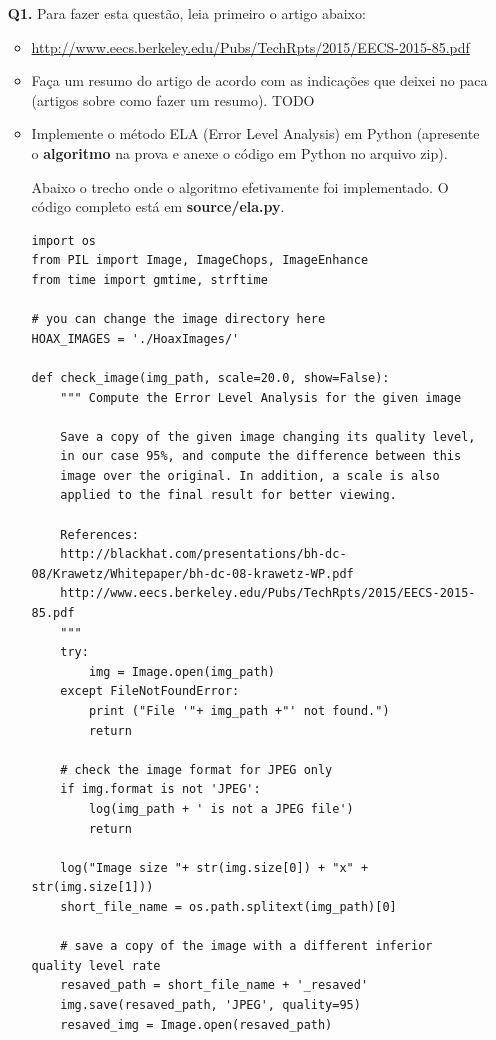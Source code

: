 \documentclass[12pt]{article}
\begin{document}
\begin{itemize}
\item[{\bf Q1.}] Para fazer esta questão, leia primeiro o artigo abaixo:
\begin{itemize}
\item \url{http://www.eecs.berkeley.edu/Pubs/TechRpts/2015/EECS-2015-85.pdf}
\end{itemize} 
\begin{itemize}
\item Faça um resumo do artigo de acordo com as indicações que deixei no paca (artigos sobre como fazer um resumo).
TODO

\item Implemente o método ELA (Error Level Analysis) em Python (apresente o 
\textbf{algoritmo} na prova e anexe o código em Python no arquivo zip).

Abaixo o trecho onde o algoritmo efetivamente foi implementado. O código completo está em \textbf{source/ela.py}.
    
\begin{lstlisting}[basicstyle=\ttfamily]
import os
from PIL import Image, ImageChops, ImageEnhance
from time import gmtime, strftime

# you can change the image directory here
HOAX_IMAGES = './HoaxImages/'

def check_image(img_path, scale=20.0, show=False):
    """ Compute the Error Level Analysis for the given image
    
    Save a copy of the given image changing its quality level,
    in our case 95%, and compute the difference between this 
    image over the original. In addition, a scale is also 
    applied to the final result for better viewing.
    
    References: 
    http://blackhat.com/presentations/bh-dc-08/Krawetz/Whitepaper/bh-dc-08-krawetz-WP.pdf
    http://www.eecs.berkeley.edu/Pubs/TechRpts/2015/EECS-2015-85.pdf
    """
    try:
        img = Image.open(img_path)
    except FileNotFoundError:
        print ("File '"+ img_path +"' not found.")
        return
    
    # check the image format for JPEG only
    if img.format is not 'JPEG':
        log(img_path + ' is not a JPEG file')
        return

    log("Image size "+ str(img.size[0]) + "x" + str(img.size[1]))
    short_file_name = os.path.splitext(img_path)[0]
    
    # save a copy of the image with a different inferior quality level rate
    resaved_path = short_file_name + '_resaved'
    img.save(resaved_path, 'JPEG', quality=95)
    resaved_img = Image.open(resaved_path)
    

\end{lstlisting}
\end{itemize}
\end{itemize}
\end{document}
